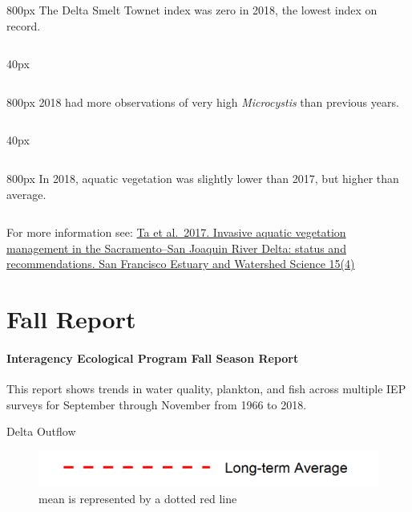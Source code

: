\documentclass[
]{book}
\begin{document}
\begin{column}{800px\textwidth}
The Delta Smelt Townet index was zero in 2018, the lowest index on record.
\end{column}

\begin{column}{40px\textwidth}
~
\end{column}

\begin{column}{800px\textwidth}
2018 had more observations of very high \emph{Microcystis} than previous years.
\end{column}

\begin{column}{40px\textwidth}
~
\end{column}

\begin{column}{800px\textwidth}
In 2018, aquatic vegetation was slightly lower than 2017, but higher than average.
\end{column}

\begin{disclaimer}
For more information see:
\href{https://escholarship.org/uc/item/828355w6}{Ta et al.~2017.
Invasive aquatic vegetation management in the Sacramento--San Joaquin
River Delta: status and recommendations. San Francisco Estuary and
Watershed Science 15(4)}
\end{disclaimer}

\hypertarget{Fall}{%
\chapter{Fall Report}\label{Fall}}

\hypertarget{interagency-ecological-program-fall-season-report}{%
\subsubsection{Interagency Ecological Program Fall Season Report}\label{interagency-ecological-program-fall-season-report}}

This report shows trends in water quality, plankton, and fish across multiple IEP
surveys for September through November from 1966 to 2018.

Delta Outflow

\begin{figure}
\includegraphics[width=15.25in]{figures/mline} \caption{mean is represented by a dotted red line}\label{fig:unnamed-chunk-92}
\end{figure}
\end{document}
